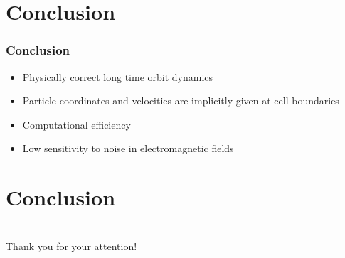 \documentclass{beamer}
\begin{document}
\section{Conclusion}
\begin{frame}
\frametitle{Conclusion}
\vspace*{-0.5cm}
\begin{itemize}
\item Physically correct long time orbit dynamics
\item Particle coordinates and velocities are implicitly given at cell boundaries
\item Computational efficiency
\item Low sensitivity to noise in electromagnetic fields

\end{itemize}
\end{frame}

\section{Conclusion}



\section{ }
 \begin{frame}
\vspace*{2.5cm}
\centerline{\huge Thank you for your attention!}
 \end{frame}



\end{document}

